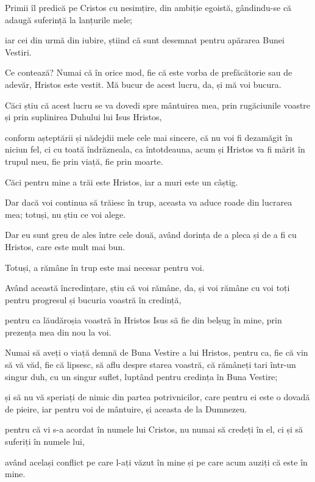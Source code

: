 {Primii îl predică pe Cristos cu nesimțire, din ambiție egoistă, gândindu-se că adaugă suferință la lanțurile mele;

iar cei din urmă din iubire, știind că sunt desemnat pentru apărarea Bunei Vestiri.


\par }{\PP {}Ce contează? Numai că în orice mod, fie că este vorba de prefăcătorie sau de adevăr, Hristos este vestit. Mă bucur de acest lucru, da, și mă voi bucura.

Căci știu că acest lucru se va dovedi spre mântuirea mea, prin rugăciunile voastre și prin suplinirea Duhului lui Isus Hristos,

conform așteptării și nădejdii mele cele mai sincere, că nu voi fi dezamăgit în niciun fel, ci cu toată îndrăzneala, ca întotdeauna, acum și Hristos va fi mărit în trupul meu, fie prin viață, fie prin moarte.

Căci pentru mine a trăi este Hristos, iar a muri este un câștig.

Dar dacă voi continua să trăiesc în trup, aceasta va aduce roade din lucrarea mea; totuși, nu știu ce voi alege.

Dar eu sunt greu de ales între cele două, având dorința de a pleca și de a fi cu Hristos, care este mult mai bun.

Totuși, a rămâne în trup este mai necesar pentru voi.

Având această încredințare, știu că voi rămâne, da, și voi rămâne cu voi toți pentru progresul și bucuria voastră în credință,

pentru ca lăudăroșia voastră în Hristos Isus să fie din belșug în mine, prin prezența mea din nou la voi.


\par }{\PP {}Numai să aveți o viață demnă de Buna Vestire a lui Hristos, pentru ca, fie că vin să vă văd, fie că lipsesc, să aflu despre starea voastră, că rămâneți tari într-un singur duh, cu un singur suflet, luptând pentru credința în Buna Vestire;

și să nu vă speriați de nimic din partea potrivnicilor, care pentru ei este o dovadă de pieire, iar pentru voi de mântuire, și aceasta de la Dumnezeu.

pentru că vi s-a acordat în numele lui Cristos, nu numai să credeți în el, ci și să suferiți în numele lui,

având același conflict pe care l-ați văzut în mine și pe care acum auziți că este în mine.



}
